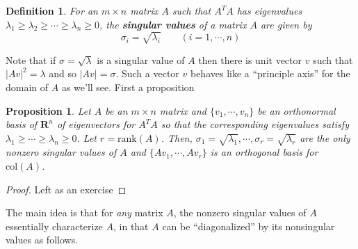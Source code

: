 \documentclass[12pt]{article}
\numberwithin{equation}{subsection}
\numberwithin{figure}{subsection}
\newtheorem{defn}[subsection]{Definition}
\newtheorem{prop}[subsection]{Proposition}
\theoremstyle{note}
\newcommand{\R}{\mathbf{R}}
\newcommand\col[1]{\mathrm{col}(#1)}
\newcommand\rank[1]{\mathrm{rank}(#1)}
\begin{document}
\begin{defn} For an $m\times n$ matrix $A$ such that $A^TA$ has eigenvalues $\lambda_1\geq \lambda_2\geq\cdots\geq \lambda_n\geq0$, the \textbf{singular values} of a matrix $A$ are given by \begin{equation} \sigma_i=\sqrt{\lambda_i} \qquad  (i=1,\cdots,n)\end{equation}
\end{defn}
Note that if $\sigma=\sqrt{\lambda}$ is a singular value of $A$ then there is unit vector $v$ such that $|Av|^2=\lambda$ and so $|Av|=\sigma$. Such a vector $v$ behaves like a ``principle axis'' for the domain of $A$ as we'll see. First a proposition

\begin{prop}\label{prop:symrank}
	Let $A$ be an $m\times n$ matrix and $\{v_1,\cdots,v_n\}$ be an orthonormal basis of $\R^n$ of eigenvectors for $A^TA$ so that the corresponding eigenvalues satisfy $\lambda_1\geq \cdots \geq \lambda_n\geq 0$. Let $r=\rank{A}$. Then, $\sigma_1=\sqrt{\lambda_1},\cdots,\sigma_r=\sqrt{\lambda_r}$ are the only nonzero singular values of $A$ and $\{Av_1,\cdots,Av_r\}$ is an orthogonal basis for $\col{A}$.

\end{prop}

\begin{proof} Left as an exercise\end{proof}
The main idea is that for \textit{any} matrix $A$, the nonzero singular values of $A$ essentially characterize $A$, in that $A$ can be ``diagonalized'' by its nonsingular values as follows.
\end{document}
